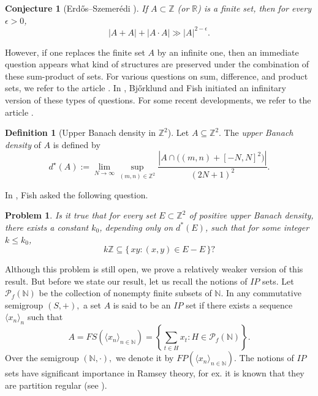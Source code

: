 \documentclass{article}
\theoremstyle{Theorem}
\newtheorem{problem}[thm]{Problem}
\newtheorem{conjecture}[thm]{Conjecture}
\theoremstyle{definition}
\newtheorem{defn}[thm]{Definition}
\newcommand{\N}{\mathbb{N}}
\begin{document}
\begin{conjecture}[Erd\H{o}s--Szemer\'{e}di \cite{erdos}]
If $A \subset \mathbb{Z}$ (or $\mathbb{R}$) is a finite set, then for every $\epsilon>0$,
\[
|A+A| + |A\cdot A| \gg |A|^{2-\epsilon}.
\]
\end{conjecture}

However, if one replaces the finite set $A$ by an infinite one, then an immediate question appears what kind of structures are preserved under the combination of these sum-product of sets.
For various questions on sum, difference, and product sets, we refer to the article \cite{ruzsa}.
In \cite{fishold, fish},  Bj\H{o}rklund and Fish initiated an infinitary version of these types of questions. For some recent developments, we refer to the article \cite{BF}. 


\begin{defn}[Upper Banach density in $\mathbb{Z}^2$]
Let $A \subseteq \mathbb{Z}^2$. The \emph{upper Banach density} of $A$ is defined by
\[
d^\star(A)
:=
\lim_{N \to \infty}
\sup_{(m,n)\in \mathbb{Z}^2}
\frac{
\left|
A \cap \bigl( (m,n) + [-N,N]^2 \bigr)
\right|
}{
(2N+1)^2
}.
\]
\end{defn}

In \cite{fish}, Fish asked the following question.

\begin{problem}\textup{\cite[Problem 2 (page 5)]{fish}}\label{qn}
Is it true that for every set \(E \subset \mathbb{Z}^2\) of positive upper Banach density,
there exists a constant \(k_0\), depending only on \(d^*(E)\), such that for some integer
\(k \le k_0\),
\[
k\mathbb{Z} \subseteq \{\, xy : (x,y) \in E - E \,\}?
\]
\end{problem}

Although this problem is still open, we prove a relatively weaker version of this result. But before we state our result, let us recall the notions of $IP$ sets. Let $\mathcal{P}_{f}\left(\mathbb{N}\right)$ be the collection of nonempty finite subsets of $\mathbb{N}.$ In any commutative semigroup $(S,+),$ a set $A$ is said to be an $IP$ set if there exists a sequence $\langle x_n\rangle_n$ such that $$A=FS\left(\langle x_{n}\rangle_{n\in\mathbb{N}}\right)=\left\{ \sum_{t\in H}x_{t}:H\in\mathcal{P}_{f}\left(\mathbb{N}\right)\right\}.$$ Over the semigroup $(\N,\cdot ),$ we denote it by $FP\left(\langle x_{n}\rangle_{n\in\mathbb{N}}\right).$
The notions of $IP$ sets have significant importance in Ramsey theory, for ex. it is known that they are partition regular (see \cite{sum}).
\end{document}
